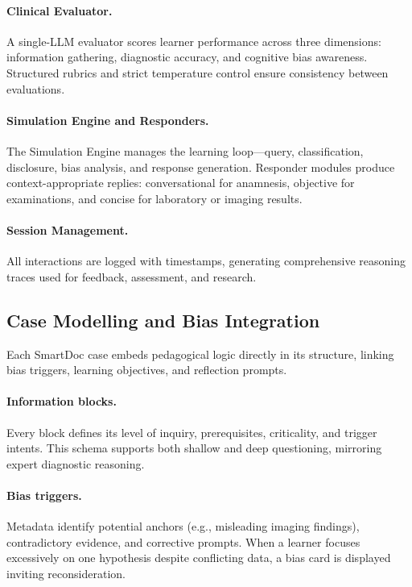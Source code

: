 \paragraph{Clinical Evaluator.}
A single-LLM evaluator scores learner performance across three dimensions:
information gathering, diagnostic accuracy, and cognitive bias awareness.
Structured rubrics and strict temperature control ensure consistency between
evaluations.

\paragraph{Simulation Engine and Responders.}
The Simulation Engine manages the learning loop—query, classification,
disclosure, bias analysis, and response generation. Responder modules produce
context-appropriate replies: conversational for anamnesis, objective for
examinations, and concise for laboratory or imaging results.

\paragraph{Session Management.}
All interactions are logged with timestamps, generating comprehensive reasoning
traces used for feedback, assessment, and research.

\subsection{Case Modelling and Bias Integration}

Each SmartDoc case embeds pedagogical logic directly in its structure, linking
bias triggers, learning objectives, and reflection prompts.

\paragraph{Information blocks.}
Every block defines its level of inquiry, prerequisites, criticality, and
trigger intents. This schema supports both shallow and deep questioning, mirroring
expert diagnostic reasoning.

\paragraph{Bias triggers.}
Metadata identify potential anchors (e.g., misleading imaging findings),
contradictory evidence, and corrective prompts. When a learner focuses
excessively on one hypothesis despite conflicting data, a bias card is displayed
inviting reconsideration.

